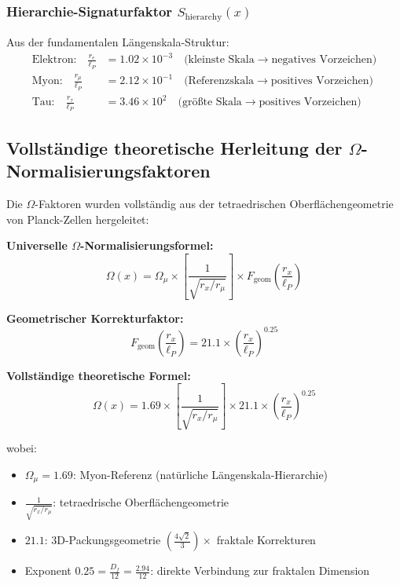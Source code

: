 \documentclass[12pt,a4paper]{article}
\numberwithin{equation}{section}
\newcommand{\Df}{D_f}
\newcommand{\lP}{\ell_P}
\newcommand{\Omegafactor}{\Omega}
\begin{document}
	\subsubsection{Hierarchie-Signaturfaktor $S_{\text{hierarchy}}(x)$}
	
	Aus der fundamentalen Längenskala-Struktur:
	\begin{align}
		\text{Elektron:} \quad \frac{r_e}{\ell_P} &= 1.02 \times 10^{-3} \quad \text{(kleinste Skala} \rightarrow \text{negatives Vorzeichen)}\\
		\text{Myon:} \quad \frac{r_\mu}{\ell_P} &= 2.12 \times 10^{-1} \quad \text{(Referenzskala} \rightarrow \text{positives Vorzeichen)}\\
		\text{Tau:} \quad \frac{r_\tau}{\ell_P} &= 3.46 \times 10^{2} \quad \text{(größte Skala} \rightarrow \text{positives Vorzeichen)}
		\label{eq:length_scales}
	\end{align}
	
	\subsection{Vollständige theoretische Herleitung der $\Omega$-Normalisierungsfaktoren}
	
	Die $\Omega$-Faktoren wurden vollständig aus der tetraedrischen Oberflächengeometrie von Planck-Zellen hergeleitet:
	
	\textbf{Universelle $\Omegafactor$-Normalisierungsformel:}
	\begin{equation}
		\Omegafactor(x) = \Omegafactor_\mu \times \left[\frac{1}{\sqrt{r_x/r_\mu}}\right] \times F_{\text{geom}}\left(\frac{r_x}{\lP}\right)
		\label{eq:omega_universal}
	\end{equation}
	
	\textbf{Geometrischer Korrekturfaktor:}
	\begin{equation}
		F_{\text{geom}}\left(\frac{r_x}{\lP}\right) = 21.1 \times \left(\frac{r_x}{\lP}\right)^{0.25}
		\label{eq:f_geom}
	\end{equation}
	
	\textbf{Vollständige theoretische Formel:}
	\begin{equation}
		\Omegafactor(x) = 1.69 \times \left[\frac{1}{\sqrt{r_x/r_\mu}}\right] \times 21.1 \times \left(\frac{r_x}{\lP}\right)^{0.25}
		\label{eq:omega_complete}
	\end{equation}
	
	wobei:
	\begin{itemize}
		\item $\Omega_\mu = 1.69$: Myon-Referenz (natürliche Längenskala-Hierarchie)
		\item $\frac{1}{\sqrt{r_x/r_\mu}}$: tetraedrische Oberflächengeometrie
		\item $21.1$: 3D-Packungsgeometrie $\left(\frac{4\sqrt{2}}{3}\right) \times$ fraktale Korrekturen
		\item Exponent $0.25 = \frac{\Df}{12} = \frac{2.94}{12}$: direkte Verbindung zur fraktalen Dimension
	\end{itemize}
	
\end{document}
